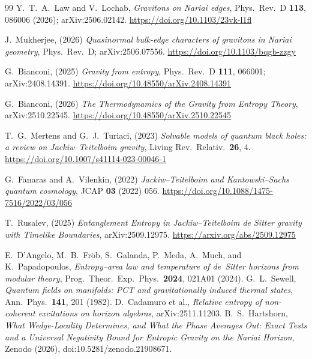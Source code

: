 \documentclass[11pt]{article}
\begin{document}
\begin{thebibliography}{99}
 Y.~T.~A.~Law and V.~Lochab, \emph{Gravitons on Nariai edges}, Phys.\ Rev.\ D \textbf{113}, 086006 (2026); arXiv:2506.02142.
\url{https://doi.org/10.1103/23vk-l1fl}

 J.~Mukherjee, (2026) \emph{Quasinormal bulk-edge characters of gravitons in Nariai geometry}, Phys.\ Rev.\ D; arXiv:2506.07556.
\url{https://doi.org/10.1103/bqgb-zzgy}

 G.~Bianconi, (2025) \emph{Gravity from entropy}, Phys.\ Rev.\ D \textbf{111}, 066001; arXiv:2408.14391.
\newline \url{https://doi.org/10.48550/arXiv.2408.14391}

 G.~Bianconi, (2026) \emph{The Thermodynamics of the Gravity from Entropy Theory}, arXiv:2510.22545.
\newline \url{https://doi.org/10.48550/arXiv.2510.22545}

 T.~G.~Mertens and G.~J.~Turiaci, (2023) \emph{Solvable models of quantum black holes: a review on Jackiw--Teitelboim gravity}, Living Rev.\ Relativ.\ \textbf{26}, 4.
\url{https://doi.org/10.1007/s41114-023-00046-1}

 G.~Fanaras and A.~Vilenkin, (2022) \emph{Jackiw--Teitelboim and Kantowski--Sachs quantum cosmology}, JCAP \textbf{03} (2022) 056.
\url{https://doi.org/10.1088/1475-7516/2022/03/056}

 T.~Rusalev, (2025) \emph{Entanglement Entropy in Jackiw--Teitelboim de Sitter gravity with Timelike Boundaries}, arXiv:2509.12975. \url{https://arxiv.org/abs/2509.12975}


 E.~D'Angelo, M.~B.~Fr\"ob, S.~Galanda, P.~Meda, A.~Much, and K.~Papadopoulos, \emph{Entropy--area law and temperature of de~Sitter horizons from modular theory}, Prog.\ Theor.\ Exp.\ Phys.\ \textbf{2024}, 021A01 (2024).
 G.~L.~Sewell, \emph{Quantum fields on manifolds: PCT and gravitationally induced thermal states}, Ann.\ Phys.\ \textbf{141}, 201 (1982).
 D.~Cadamuro et al., \emph{Relative entropy of non-coherent excitations on horizon algebras}, arXiv:2511.11203.
 B.~S.~Hartshorn, \emph{What Wedge-Locality Determines, and What the Phase Averages Out: Exact Tests and a Universal Negativity Bound for Entropic Gravity on the Nariai Horizon}, Zenodo (2026), doi:10.5281/zenodo.21908671.
\end{thebibliography}
\endgroup
\end{document}
